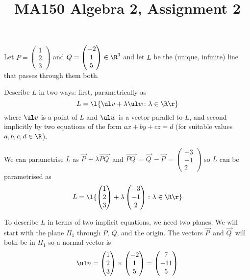 \documentclass[a4paper]{article}
\title{MA150 Algebra 2, Assignment 2}
\begin{document}
\maketitle

\setlength{\parindent}{0em}
\setlength{\parskip}{1em}


\begin{questionbody}
Let $P = \begin{pmatrix}1 \\ 2 \\ 3\end{pmatrix}$ and $Q = \begin{pmatrix}-2 \\ 1 \\ 5\end{pmatrix} \in \R^3$ and let $L$ be the (unique, infinite) line that passes through them both.

Describe $L$ in two ways: first, parametrically as \[
L = \l\{ \ul v + \lambda \ul w \colon \lambda \in \R \r\}
\] where $\ul v$ is a point of $L$ and $\ul w$ is a vector parallel to $L$, and second implicitly by two equations of the form $ax + by + cz = d$ (for suitable values $a, b, c, d \in \R$).
\end{questionbody}

We can parametrise $L$ as $\overrightarrow{P\,} + \lambda \overrightarrow{PQ\,}$ and $\overrightarrow{PQ\,} = \overrightarrow{Q\,} - \overrightarrow{P\,} = \begin{pmatrix}-3 \\ -1 \\ 2\end{pmatrix}$ so $L$ can be parametrised as \[ L = \l\{
\begin{pmatrix}1 \\ 2 \\ 3\end{pmatrix} + \lambda \begin{pmatrix}-3 \\ -1 \\ 2\end{pmatrix}
\colon \lambda \in \R
\r\} \]

To describe $L$ in terms of two implicit equations, we need two planes. We will start with the plane $\Pi_1$ through $P$, $Q$, and the origin. The vectors $\overrightarrow{P\,}$ and $\overrightarrow{Q\,}$ will both be in $\Pi_1$ so a normal vector is \[
\ul n = \begin{pmatrix}1 \\ 2 \\ 3\end{pmatrix}
\times \begin{pmatrix}-2 \\ 1 \\ 5\end{pmatrix}
= \begin{pmatrix}7 \\ -11 \\ 5\end{pmatrix}
\]
\end{document}
